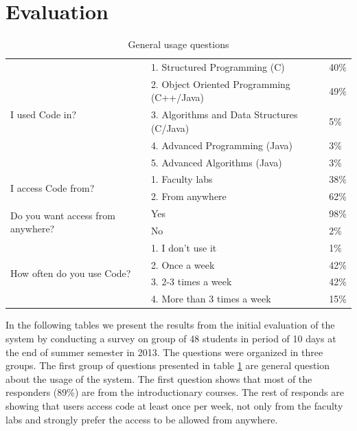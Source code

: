 \documentclass{llncs}
\begin{document}
\section{Evaluation}

\begin{table}[htb]
\caption{General usage questions}
\begin{center}
\begin{tabular}{ |p{5cm}|p{5cm}|l| }
\hline
\multirow{5}{*}{I used Code in?} & 1. Structured Programming (C) & 40\% \\
\cline{2-3}
 & 2. Object Oriented Programming (C++/Java) & 49\% \\
 \cline{2-3}
 & 3. Algorithms and Data Structures (C/Java) & 5\% \\
 \cline{2-3}
 & 4. Advanced Programming (Java) & 3\% \\
 \cline{2-3}
 & 5. Advanced Algorithms (Java) & 3\% \\
 \cline{2-3}
\hline
\multirow{2}{*}{I access Code from?} & 1. Faculty labs & 38\% \\
 & 2. From anywhere & 62\% \\
 \hline
\multirow{2}{5cm}{Do you want access from anywhere?} & Yes & 98\% \\
\cline{2-3}
 & No & 2\% \\
\hline
\multirow{4}{*}{How often do you use Code?} & 1. I don't use it & 1\% \\
\cline{2-3}
 & 2. Once a week & 42\% \\
 \cline{2-3}
 & 3. 2-3 times a week & 42\% \\
 \cline{2-3}
 & 4. More than 3 times a week & 15\% \\
 \cline{2-3}
\hline
\end{tabular}
\label{table:general_questions}
\end{center}
\end{table}
In the following tables we present the results from the initial evaluation of
the system by conducting a survey on group of 48 students in period of 10 days
at the end of summer semester in 2013. The questions were organized in
three groups. The first group of questions presented in table
\ref{table:general_questions} are general question about the usage of the
system. The first question shows that most of the responders (89\%) are from the
introductionary courses. The rest of responds are showing that users access
code at least once per week, not only from the faculty labs and strongly prefer
the access to be allowed from anywhere.
\end{document}
